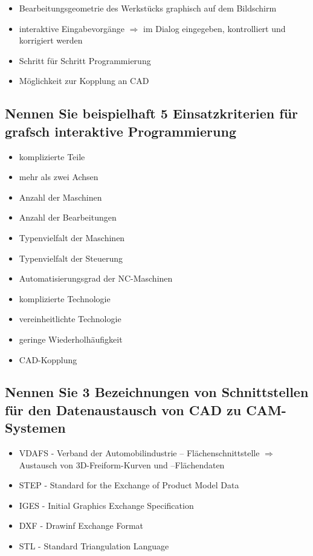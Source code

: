 \begin{itemize}
\item Bearbeitungsgeometrie des Werkstücks graphisch auf dem Bildschirm
\item interaktive Eingabevorgänge $\Rightarrow$ im Dialog eingegeben, kontrolliert 
und korrigiert werden
\item Schritt für Schritt Programmierung
\item Möglichkeit zur Kopplung an CAD
\end{itemize}


\subsection*{Nennen Sie beispielhaft 5 Einsatzkriterien für grafsch interaktive Programmierung}


\begin{itemize}
\item komplizierte Teile 
\item mehr als zwei Achsen 
\item Anzahl der Maschinen 
\item Anzahl der Bearbeitungen 
\item Typenvielfalt der Maschinen 
\item Typenvielfalt der Steuerung 
\item Automatisierungsgrad der NC-Maschinen 
\item komplizierte Technologie
\item vereinheitlichte Technologie 
\item geringe Wiederholhäufigkeit 
\item CAD-Kopplung
\end{itemize}


\subsection*{Nennen Sie 3 Bezeichnungen von Schnittstellen für den Datenaustausch von CAD zu CAM-Systemen}

\begin{itemize}
\item VDAFS - Verband der Automobilindustrie – Flächenschnittstelle $\Rightarrow$ Austausch von 3D-Freiform-Kurven und –Flächendaten 
\item STEP - Standard for the Exchange of Product Model Data 
\item IGES - Initial Graphics Exchange Specification 
\item DXF - Drawinf Exchange Format 
\item STL - Standard Triangulation Language 
\end{itemize}


